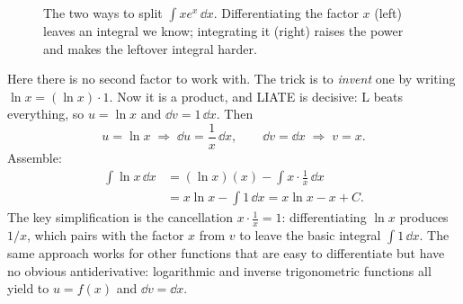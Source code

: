 \begin{figure}[htbp]
\centering
{}
\caption{The two ways to split $\int x e^x\,\dd x$. Differentiating the factor $x$
(left) leaves an integral we know; integrating it (right) raises the power and
makes the leftover integral harder.}
\label{ch23:fig-choice}
\end{figure}

\begin{example}
\label{ch23:ex-lnx}
Here there is no second factor to work with. The trick is
to \emph{invent} one by writing $\ln x = (\ln x)\cdot 1$. Now it is a product, and
LIATE is decisive: L beats everything, so $u = \ln x$ and $\dd v = 1\,\dd x$.
Then
\[
u = \ln x \;\Rightarrow\; \dd u = \frac{1}{x}\,\dd x, \qquad
\dd v = \dd x \;\Rightarrow\; v = x.
\]
Assemble:
\begin{align*}
\int \ln x\,\dd x &= (\ln x)(x) - \int x\cdot\frac{1}{x}\,\dd x\\
&= x\ln x - \int 1\,\dd x = x\ln x - x + C.
\end{align*}
The key simplification is the cancellation $x\cdot\frac{1}{x}=1$: differentiating $\ln x$
produces $1/x$, which pairs with the factor $x$ from $v$ to leave the basic integral
$\int 1\,\dd x$. The same approach works for other functions that are easy to
differentiate but have no obvious antiderivative: logarithmic
and inverse trigonometric functions all yield to $u = f(x)$ and $\dd v = \dd x$.
\end{example}

